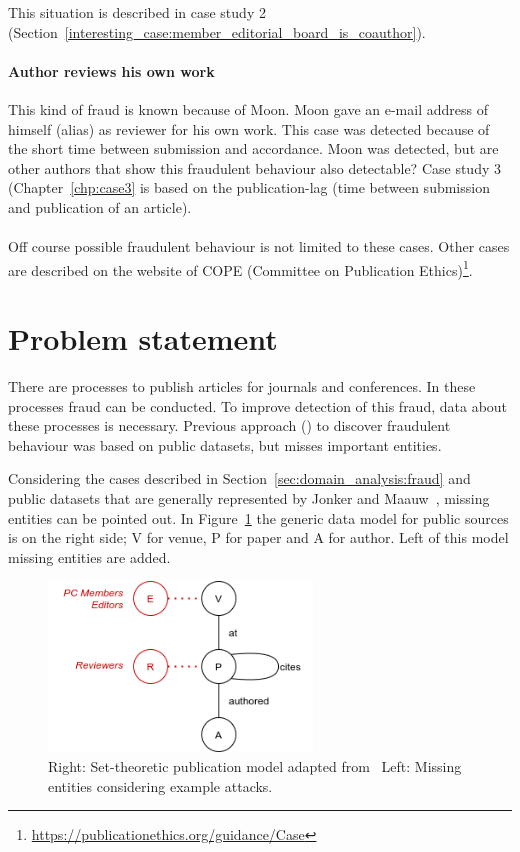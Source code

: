 \documentclass{ou-report}
\begin{document}
This situation is described in case study 2
(Section~\ref{interesting_case:member_editorial_board_is_coauthor}).

\paragraph{Author reviews his own work}
This kind of fraud is known because of Moon. Moon gave an e-mail address of 
himself (alias) as reviewer for his own work. This case was detected because of
the short time between submission and accordance. Moon was detected, but are 
other authors that show this fraudulent behaviour also detectable?
Case study 3 (Chapter~\ref{chp:case3} is based on the publication-lag (time 
between submission and publication of an article).

\paragraph{}
Off course possible fraudulent behaviour is not limited to these cases. Other 
cases are
described on the website of COPE (Committee on Publication Ethics)\footnote{\url{https://publicationethics.org/guidance/Case}}.

\section{Problem statement}
\label{sec:problem_statement}
There are processes to publish articles for journals and conferences.
In these processes fraud can be conducted.
To improve detection of this fraud, data about these processes is necessary.
Previous approach (\cite{TEJ2017}) to discover fraudulent behaviour was based 
on public datasets, but misses important entities. 

Considering the cases described in Section~\ref{sec:domain_analysis:fraud} and 
public datasets that are generally represented by Jonker and Maauw~\cite{JM2017},
missing entities can be pointed out.
In Figure~\ref{fig:jm2017_missing_ent} the generic data model for public 
sources is on the right side; V for venue, P for paper and A for author. Left of 
this model missing entities are added.


\begin{figure}[H]
\centering
\includegraphics[width=7cm]{images/jm2017_miss_ent.png}
\caption{Right: Set-theoretic publication model adapted from~\cite{JM2017} Left: Missing entities considering example attacks.}
\label{fig:jm2017_missing_ent}
\end{figure}
\end{document}
